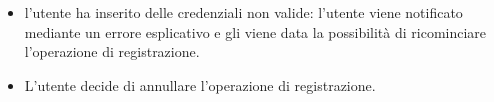 \begin{itemize}
    \item l'utente ha inserito delle credenziali non valide: l'utente viene notificato mediante un errore esplicativo e gli viene data la possibilità di ricominciare l'operazione di registrazione.
    \item L'utente decide di annullare l'operazione di registrazione.
\end{itemize}

